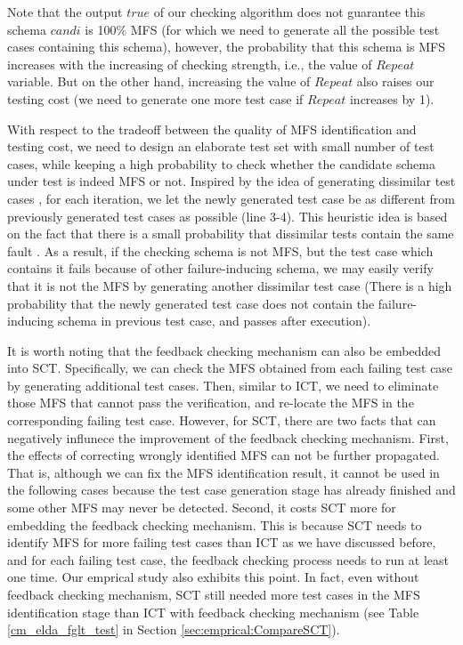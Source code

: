 \documentclass[10pt,journal,compsoc]{IEEEtran}
\begin{document}
Note that the output $true$ of our checking algorithm does not guarantee this schema $candi$ is 100\% MFS (for which we need to generate all the possible test cases containing this schema), however, the probability that this schema is MFS increases with the increasing of checking strength, i.e., the value of $Repeat$ variable. But on the other hand, increasing the value of $Repeat$ also raises our testing cost (we need to generate one more test case if $Repeat$ increases by 1).

With respect to the tradeoff between the quality of MFS identification and testing cost, we need to design an elaborate test set with small number of test cases, while keeping a high probability to check whether the candidate schema under test is indeed MFS or not. Inspired by the idea of generating dissimilar test cases \cite{henard2014bypassing,henard2016comparing}, for each iteration, we let the newly generated test case be as different from previously generated test cases as possible (line 3-4). This heuristic idea is based on the fact that there is a small probability that dissimilar tests contain the same fault \cite{henard2014bypassing}.  As a result, if the checking schema is not MFS, but the test case which contains it fails because of other failure-inducing schema, we may easily verify that it is not the MFS by generating another dissimilar test case (There is a high probability that the newly generated test case does not contain the failure-inducing schema in previous test case, and passes after execution).


{\color{red}It is worth noting that the  feedback checking mechanism can also be embedded into SCT. Specifically, we can check the MFS obtained from each failing test case by generating additional test cases. Then, similar to ICT, we need to eliminate those MFS that cannot pass the verification, and re-locate the MFS in the corresponding failing test case. However, for SCT, there are two facts that can negatively influnece the improvement of the feedback checking mechanism. First, the effects of correcting wrongly identified MFS can not be further propagated. That is, although we can fix the MFS identification result, it cannot be used in the following cases because the test case generation stage has already finished and some other MFS may never be detected. Second, it costs SCT more for embedding  the  feedback checking mechanism. This is because SCT needs to identify MFS for more failing test cases than ICT as we have discussed before, and for each failing test case, the feedback checking process needs to run at least one time. Our emprical study also exhibits this point. In fact, even without feedback checking mechanism, SCT still needed more test cases in the MFS identification stage than ICT with feedback checking mechanism (see Table \ref{cm_elda_fglt_test} in Section \ref{sec:emprical:CompareSCT}). }
\end{document}
